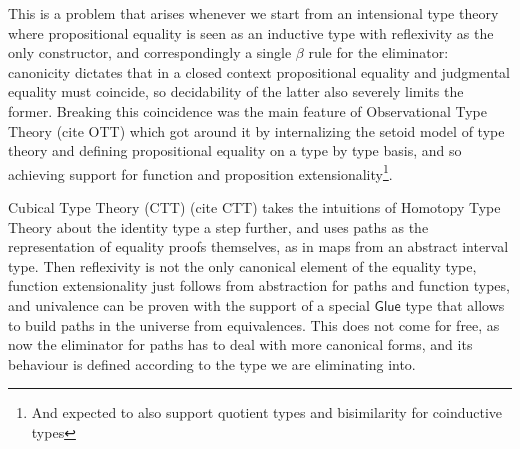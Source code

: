 \documentclass{book}
\begin{document}
  This is a problem that arises whenever we start from an intensional
  type theory where propositional equality is seen as an inductive
  type with reflexivity as the only constructor, and correspondingly a
  single $\beta$ rule for the eliminator: canonicity dictates that in
  a closed context propositional equality and judgmental equality must
  coincide, so decidability of the latter also severely limits the
  former. Breaking this coincidence was the main feature of Observational Type Theory (cite OTT) which got around it by
  internalizing the setoid model of type theory and defining
  propositional equality on a type by type basis, and so achieving
  support for function and proposition extensionality\footnote{And expected to also support quotient types and bisimilarity for coinductive types}.

  Cubical Type Theory (CTT) (cite CTT) takes the intuitions of Homotopy
  Type Theory about the identity type a step further, and uses paths
  as the representation of equality proofs themselves, as in maps from
  an abstract interval type. Then reflexivity is not the only
  canonical element of the equality type, function extensionality just
  follows from abstraction for paths and function types, and
  univalence can be proven with the support of a special
  $\mathsf{Glue}$ type that allows to build paths in the universe from
  equivalences. This does not come for free, as now the eliminator for
  paths has to deal with more canonical forms, and its
  behaviour is defined according to the type we are eliminating into.
\end{document}
